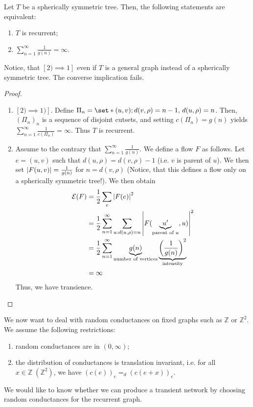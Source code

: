 \begin{thm}[]
  Let \(T\) be a spherically symmetric tree. Then, the following statements are equivalent:
  \begin{enumerate}[1)]
    \item \(T\) is recurrent;
    \item \(\sum_{n=1}^{\infty} \frac{1}{g(n)}=\infty \).
  \end{enumerate}
  Notice, that \([2) \implies 1]\) even if \(T \) is a general graph instead of a spherically symmetric tree. The converse implication fails.
\end{thm}

\begin{proof}
    \begin{enumerate}[]
      \item \([2) \implies 1)]\). Define \(\Pi_n= \set*{(u,v); d(v,\rho)=n-1,\, d(u,\rho)=n}\). Then, \((\Pi_n)_n\) is a sequence of disjoint cutsets, and setting \(c(\Pi_n)=g(n)\) yields \(\sum_{n=1}^{\infty} \frac{1}{c(\Pi_n)}= \infty \). Thus \(T\) is recurrent.
      \item Assume to the contrary that \(\sum_{n=1}^{\infty} \frac{1}{g(n)}\). We define a flow \(F\) as follows. Let \(e=(u,v)\) such that \(d(u,\rho)=d(v,\rho)-1\) (i.e. \(v\) is parent of \(u\)). We then set \(\abs{F(u,v)}=\frac{1}{g(n)}\) for \(n=d(v,\rho)\) (Notice, that this defines a flow only on a spherically symmetric tree!). We then obtain
        \begin{align*}
          \mathcal{E}(F) &= \frac{1}{2}\sum_e \abs{F(e)} ^2 \\
                         &=\frac{1}{2}\sum_{n=1}^{\infty} \sum_{{u:d(u,\rho)=n}}^{} \abs{F(\underbrace{u'}_{\text{parent of \(u\)}},u)}^2 \\
                         &= \frac{1}{2} \sum_{n=1}^{\infty} \underbrace{g(n)}_{\text{number of vertices}} \underbrace{\left(\frac{1}{g(n)}\right)^2}_{\text{intensity}} \\
                         &= \infty 
        \end{align*}
        Thus, we have transience. 
    \end{enumerate}
    
\end{proof}

We now want to deal with random conductances on fixed graphs such as \(\mathbb{Z}\) or \(\mathbb{Z}^2\). We assume the following restrictions:
\begin{enumerate}[1)]
  \item random conductances are in \((0, \infty)\);
  \item the distribution of conductances is translation invariant, i.e. for all \(x \in \mathbb{Z}\; (\mathbb{Z}^2)\), we have  \((c(e))_e =_d (c(e+x))_e\).
\end{enumerate}
We would like to know whether we can produce a transient network by choosing random conductances for the recurrent graph.
